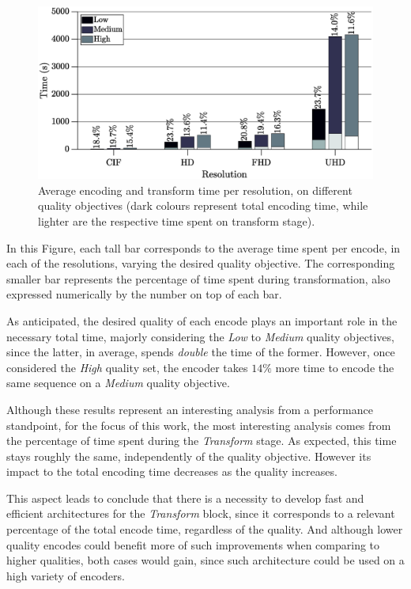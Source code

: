\begin{figure}[!htpb]
    \centering
    \includegraphics[width=\textwidth]{Sections/3Transforms/Images/TimingAnalysisAvg.eps}
    \caption[Average encoding and transform time per resolution, on different quality objectives]{Average encoding and transform time per resolution, on different quality objectives (dark colours represent total encoding time, while lighter are the respective time spent on transform stage).}
    \label{fig:timeavg}
\end{figure}

In this Figure, each tall bar corresponds to the average time spent per encode, in each of the resolutions, varying the desired quality objective. The corresponding smaller bar represents the percentage of time spent during transformation, also expressed numerically by the number on top of each bar.

As anticipated, the desired quality of each encode plays an important role in the necessary total time, majorly considering the \emph{Low} to \emph{Medium} quality objectives, since the latter, in average, spends \emph{double} the time of the former. However, once considered the \emph{High} quality set, the encoder takes $14 \%$ more time to encode the same sequence on a \emph{Medium} quality objective.

Although these results represent an interesting analysis from a performance standpoint, for the focus of this work, the most interesting analysis comes from the percentage of time spent during the \emph{Transform} stage. As expected, this time stays roughly the same, independently of the quality objective. However its impact to the total encoding time decreases as the quality increases. 

This aspect leads to conclude that there is a necessity to develop fast and efficient architectures for the \emph{Transform} block, since it corresponds to a relevant percentage of the total encode time, regardless of the quality. And although lower quality encodes could benefit more of such improvements when comparing to higher qualities, both cases would gain, since such architecture could be used on a high variety of encoders.

